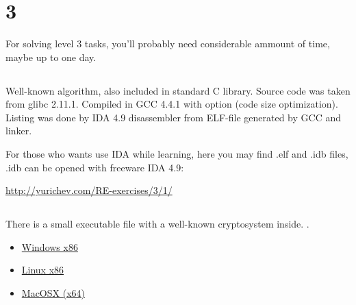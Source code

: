 ﻿\section{ 3}

{For solving level 3 tasks, you'll probably need considerable ammount of time, maybe up to one day}.

\subsection{}

{Well-known algorithm, also included in standard C library. Source code was taken from glibc 2.11.1.
Compiled in GCC 4.4.1 with  option (code size optimization).
Listing was done by IDA 4.9 disassembler from ELF-file generated by GCC and linker.}

{For those who wants use IDA while learning, here you may find .elf and .idb files,
.idb can be opened with freeware IDA 4.9:}

\url{http://yurichev.com/RE-exercises/3/1/}



\subsection{}

{There is a small executable file with a well-known cryptosystem inside}.
.

\begin{itemize}
\item
\href{http://yurichev.com/RE-exercises/3/2/unknown_cryptosystem.exe}{Windows x86}

\item
\href{http://yurichev.com/RE-exercises/3/2/unknown_encryption_linux86.tar}{Linux x86}

\item
\href{http://yurichev.com/RE-exercises/3/2/unknown_encryption_MacOSX.tar}{MacOSX (x64)}
\end{itemize}

